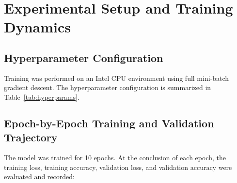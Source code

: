 \documentclass[11pt,a4paper,oneside]{report}
\begin{document}
\chapter{Experimental Setup and Training Dynamics}

\section{Hyperparameter Configuration}
Training was performed on an Intel CPU environment using full mini-batch gradient descent. The hyperparameter configuration is summarized in Table~\ref{tab:hyperparams}.

\begin{table}[H]
\centering
\caption{Experimental Hyperparameter Configuration.}
\label{tab:hyperparams}
\end{table}

\section{Epoch-by-Epoch Training and Validation Trajectory}
The model was trained for 10 epochs. At the conclusion of each epoch, the training loss, training accuracy, validation loss, and validation accuracy were evaluated and recorded:
\end{document}
